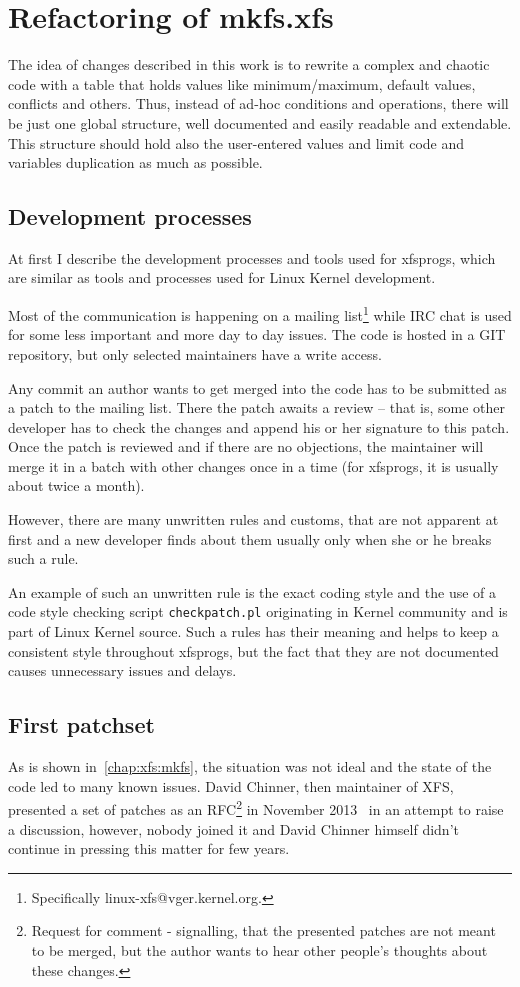 \chapter{Refactoring of mkfs.xfs} \label{chap:refactoring}

The idea of changes described in this work is to rewrite a complex and
chaotic code with a table that holds values like minimum/maximum, default
values, conflicts and others. Thus, instead of ad-hoc conditions and
operations, there will be just one global structure, well documented and
easily readable and extendable. This structure should hold also the
user-entered values and limit code and variables duplication as much as
possible.

\section{Development processes}\label{chap:refactoring:processes}

At first I describe the development processes and tools used for xfsprogs,
which are similar as tools and processes used for Linux Kernel development.

Most of the communication is happening on a mailing
list\footnote{Specifically linux-xfs@vger.kernel.org.} while IRC chat is
used for some less
important and more day to day issues. The code is hosted in a GIT repository,
but only selected maintainers have a write access.

Any commit an author wants to get merged into the code has to be submitted
as a patch to the mailing list. There the patch awaits a review -- that is,
some other developer has to check the changes and append his or her
signature to this patch. Once the patch is reviewed and if there are no
objections, the maintainer will merge it in a batch with other changes once
in a time (for xfsprogs, it is usually about twice a month).

However, there are many unwritten rules and customs, that are not apparent
at first and a new developer finds about them usually only when she or he
breaks such a rule.

An example of such an unwritten rule is the exact coding style and the use of
a code style checking script {\tt checkpatch.pl} originating in Kernel
community and is part of Linux Kernel source. Such a rules has their
meaning and helps to keep a consistent style throughout xfsprogs, but the
fact that they are not documented causes unnecessary issues and delays.

\section{First patchset}\label{chap:refactoring:first}
As is shown in~\ref{chap:xfs:mkfs}, the situation was not ideal and the
state of the code led to many known issues. David Chinner, then maintainer
of XFS, presented a set of patches as an RFC\footnote{Request for comment -
	signalling, that the presented patches are not meant to be merged,
but the author wants to hear other people's thoughts about these changes.}
in November 2013~\cite{davidsPatches} in an attempt to raise a discussion,
however, nobody joined it and David Chinner himself didn't continue in
pressing this matter for few years.

